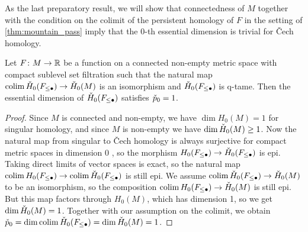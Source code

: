 As the last preparatory result, we will show that connectedness of $M$ together with the condition on the colimit of the persistent homology of $F$ in the setting of \cref{thm:mountain_pass} imply that the $0$-th essential dimension is trivial for \v{C}ech homology.

\begin{lem}
\label{lem:essential_cech_dim}
	Let $F \colon M \to \mathbb{R}$ be a function on a connected non-empty metric space with compact sublevel set filtration such that the natural map $\operatorname*{colim} \check{H}_0(F_{\leq \bullet}) \to \check{H}_0(M)$ is an isomorphism and $\check{H}_0(F_{\leq \bullet})$ is q-tame.
	Then the essential dimension of $\check{H}_0(F_{\leq \bullet})$ satisfies $\check{p}_{0} = 1$.
\end{lem}
\begin{proof}
	Since $M$ is connected and non-empty, we have $\dim H_{0}(M) = 1$ for singular homology, and since $M$ is non-empty we have $\dim \check{H}_0(M) \geq 1$.
	Now the natural map from singular to \v{C}ech homology is always surjective for compact metric spaces in dimension 0 \cite{Eda.2000}, so the morphism $H_{0}(F_{\leq \bullet}) \to \check{H}_{0}(F_{\leq \bullet})$ is epi.
	Taking direct limits of vector spaces is exact, so the natural map $\operatorname*{colim} H_{0}(F_{\leq \bullet}) \to \operatorname*{colim} \check{H}_{0}(F_{\leq \bullet})$ is still epi.
	We assume $\operatorname*{colim} \check{H}_0(F_{\leq \bullet}) \to \check{H}_0(M)$ to be an isomorphism, so the composition $\operatorname*{colim} H_0(F_{\leq \bullet}) \to \check{H}_0(M)$ is still epi.
	But this map factors through $H_{0}(M)$, which has dimension 1, so we get $\dim \check{H}_0(M) = 1$.
	Together with our assumption on the colimit, we obtain $\check{p}_0 = \dim \operatorname*{colim} \check{H}_0(F_{\leq \bullet}) = \dim \check{H}_0(M) = 1$.
\end{proof}

